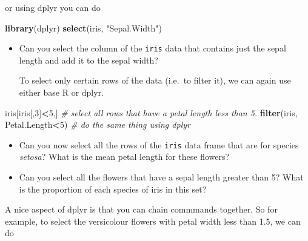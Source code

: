 \documentclass[]{book}
\newenvironment{Shaded}{\begin{snugshade}}{\end{snugshade}}
\newcommand{\CommentTok}[1]{\textcolor[rgb]{0.56,0.35,0.01}{\textit{#1}}}
\newcommand{\DecValTok}[1]{\textcolor[rgb]{0.00,0.00,0.81}{#1}}
\newcommand{\KeywordTok}[1]{\textcolor[rgb]{0.13,0.29,0.53}{\textbf{#1}}}
\newcommand{\NormalTok}[1]{#1}
\newcommand{\OperatorTok}[1]{\textcolor[rgb]{0.81,0.36,0.00}{\textbf{#1}}}
\newcommand{\StringTok}[1]{\textcolor[rgb]{0.31,0.60,0.02}{#1}}
\theoremstyle{definition}
\theoremstyle{definition}
\theoremstyle{definition}
\theoremstyle{remark}
\begin{document}
\begin{Shaded}
\end{Shaded}

or using dplyr you can do

\begin{Shaded}
\begin{Highlighting}[]
\KeywordTok{library}\NormalTok{(dplyr)}
\KeywordTok{select}\NormalTok{(iris, }\StringTok{"Sepal.Width"}\NormalTok{)}
\end{Highlighting}
\end{Shaded}

\begin{itemize}
\item
  Can you select the column of the \texttt{iris} data that contains just the sepal length and add it to the sepal width?

  To select only certain rows of the data (i.e.~to filter it), we can again use either base R or dplyr.
\end{itemize}

\begin{Shaded}
\begin{Highlighting}[]
\NormalTok{iris[iris[,}\DecValTok{3}\NormalTok{]}\OperatorTok{<}\DecValTok{5}\NormalTok{,] }\CommentTok{# select all rows that have a petal length less than 5.}
\KeywordTok{filter}\NormalTok{(iris, Petal.Length}\OperatorTok{<}\DecValTok{5}\NormalTok{) }\CommentTok{# do the same thing using dplyr}
\end{Highlighting}
\end{Shaded}

\begin{itemize}
\item
  Can you now select all the rows of the \texttt{iris} data frame that are for species \emph{setosa}? What is the mean petal length for these flowers?
\item
  Can you select all the flowers that have a sepal length greater than 5? What is the proportion of each species of iris in this set?
\end{itemize}

A nice aspect of dplyr is that you can chain commmands together. So for example, to select the versicolour flowers with petal width less than 1.5, we can do
\end{document}
